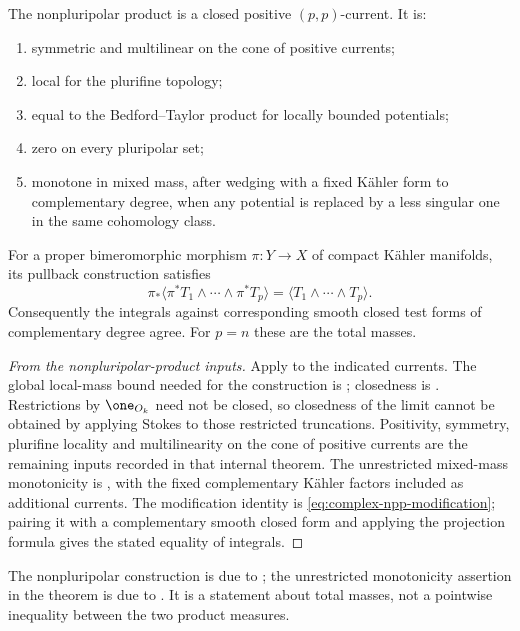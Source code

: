 \begin{theorem}\label{thm:appH-npp-ledger}
The nonpluripolar product is a closed positive \((p,p)\)-current. It is:
\begin{enumerate}
\item symmetric and multilinear on the cone of positive currents;
\item local for the plurifine topology;
\item equal to the Bedford--Taylor product for locally bounded potentials;
\item zero on every pluripolar set;
\item monotone in mixed mass, after wedging with a fixed K\"ahler form
to complementary degree, when any potential is replaced by a less
singular one in the same cohomology class.
\end{enumerate}
For a proper bimeromorphic morphism \(\pi:Y\to X\) of compact K\"ahler
manifolds, its pullback construction satisfies
\[
 \pi_*\langle\pi^*T_1\wedge\cdots\wedge\pi^*T_p\rangle
       =\langle T_1\wedge\cdots\wedge T_p\rangle.
\]
Consequently the integrals against corresponding smooth closed test forms
of complementary degree agree.  For \(p=n\) these are the total masses.
\end{theorem}

\begin{proof}[From the nonpluripolar-product inputs]
Apply  to the indicated currents.
The global local-mass bound needed for the construction is
\cite[Proposition~1.6]{BEGZ10}; closedness is
\cite[Theorem~1.8]{BEGZ10}.  Restrictions by \(\one_{O_k}\) need not be
closed, so closedness of the limit cannot be obtained by applying Stokes
to those restricted truncations.  Positivity, symmetry, plurifine
locality and multilinearity on the cone of positive currents are the
remaining inputs recorded in that internal theorem.  The unrestricted
mixed-mass monotonicity is \cite[Theorem~1.1]{DDNL18mono}, with the fixed
complementary K\"ahler factors included as additional currents.
The modification identity is \eqref{eq:complex-npp-modification}; pairing
it with a complementary smooth closed form and applying the projection
formula gives the stated equality of integrals.
\end{proof}

The nonpluripolar construction is due to \cite{BEGZ10}; the unrestricted
monotonicity assertion in the theorem is due to \cite{DDNL18mono}.  It is a
statement about total masses, not a pointwise inequality between the two
product measures.

